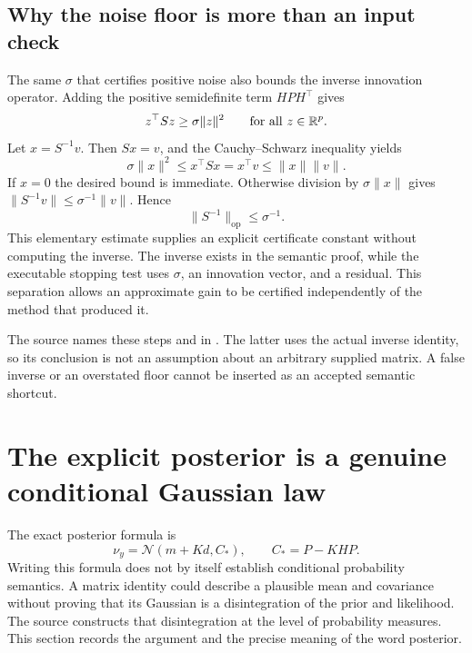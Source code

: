 \subsection{Why the noise floor is more than an input check}

The same $\sigma$ that certifies positive noise also bounds the inverse innovation operator. Adding the positive semidefinite term $HPH^\top$ gives
\begin{equation}
 z^\top Sz\ge\sigma\|z\|^2\qquad\text{for all }z\in\mathbb R^p.
 \label{eq:foundation-coercivity}
\end{equation}
Let $x=S^{-1}v$. Then $Sx=v$, and the Cauchy--Schwarz inequality yields
\[
 \sigma\|x\|^2\le x^\top Sx=x^\top v\le\|x\|\|v\|.
\]
If $x=0$ the desired bound is immediate. Otherwise division by $\sigma\|x\|$ gives $\|S^{-1}v\|\le\sigma^{-1}\|v\|$. Hence
\begin{equation}
 \|S^{-1}\|_{\mathrm{op}}\le\sigma^{-1}.
 \label{eq:foundation-inverse-bound}
\end{equation}
This elementary estimate supplies an explicit certificate constant without computing the inverse. The inverse exists in the semantic proof, while the executable stopping test uses $\sigma$, an innovation vector, and a residual. This separation allows an approximate gain to be certified independently of the method that produced it.

The source names these steps  and  in . The latter uses the actual inverse identity, so its conclusion is not an assumption about an arbitrary supplied matrix. A false inverse or an overstated floor cannot be inserted as an accepted semantic shortcut.

\section{The explicit posterior is a genuine conditional Gaussian law}
\label{sec:foundation-posterior}

The exact posterior formula is
\begin{equation}
 \nu_y=\mathcal N(m+Kd,C_*),\qquad C_*=P-KHP.
 \label{eq:foundation-exact-posterior}
\end{equation}
Writing this formula does not by itself establish conditional probability semantics. A matrix identity could describe a plausible mean and covariance without proving that its Gaussian is a disintegration of the prior and likelihood. The source constructs that disintegration at the level of probability measures. This section records the argument and the precise meaning of the word posterior.

